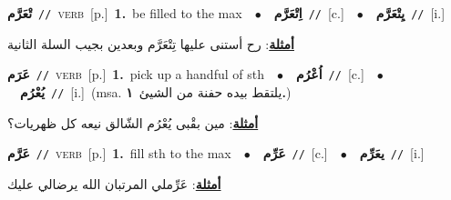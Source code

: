 \documentclass[10pt,a4paper,twoside]{article} %
\begin{document}
\begin{multicols}{2}
{\setlength\topsep{0pt}\textbf{\foreignlanguage{arabic}{تْعَرَّم}}\ {\color{gray}\texttt{//}\color{black}}\ \textsc{verb}\ [p.]\ \textbf{1.}~be filled to the max\ \ $\bullet$\ \ \setlength\topsep{0pt}\textbf{\foreignlanguage{arabic}{اِتْعَرَّم}}\ {\color{gray}\texttt{//}\color{black}}\ [c.]\ \ $\bullet$\ \ \setlength\topsep{0pt}\textbf{\foreignlanguage{arabic}{يِتْعَرَّم}}\ {\color{gray}\texttt{//}\color{black}}\ [i.]\  \begin{flushright}\color{gray}\foreignlanguage{arabic}{\textbf{\underline{\foreignlanguage{arabic}{أمثلة}}}: رح أستنى عليها تِتْعَرَّم وبعدين بجيب السلة الثانية}\end{flushright}\color{black}} \vspace{2mm}

{\setlength\topsep{0pt}\textbf{\foreignlanguage{arabic}{عَرَم}}\ {\color{gray}\texttt{//}\color{black}}\ \textsc{verb}\ [p.]\ \textbf{1.}~pick up a handful of sth\ \ $\bullet$\ \ \setlength\topsep{0pt}\textbf{\foreignlanguage{arabic}{اُعْرُم}}\ {\color{gray}\texttt{//}\color{black}}\ [c.]\ \ $\bullet$\ \ \setlength\topsep{0pt}\textbf{\foreignlanguage{arabic}{يُعْرُم}}\ {\color{gray}\texttt{//}\color{black}}\ [i.]\ \color{gray}(msa. \foreignlanguage{arabic}{يلتقط بيده حفنة من الشيئ}~\foreignlanguage{arabic}{\textbf{١.}})\color{black}\  \begin{flushright}\color{gray}\foreignlanguage{arabic}{\textbf{\underline{\foreignlanguage{arabic}{أمثلة}}}: مين بقْبى يُعْرُم الشّالق نيعه كل ظهريات؟}\end{flushright}\color{black}} \vspace{2mm}

{\setlength\topsep{0pt}\textbf{\foreignlanguage{arabic}{عَرَّم}}\ {\color{gray}\texttt{//}\color{black}}\ \textsc{verb}\ [p.]\ \textbf{1.}~fill sth to the max\ \ $\bullet$\ \ \setlength\topsep{0pt}\textbf{\foreignlanguage{arabic}{عَرِّم}}\ {\color{gray}\texttt{//}\color{black}}\ [c.]\ \ $\bullet$\ \ \setlength\topsep{0pt}\textbf{\foreignlanguage{arabic}{يعَرِّم}}\ {\color{gray}\texttt{//}\color{black}}\ [i.]\  \begin{flushright}\color{gray}\foreignlanguage{arabic}{\textbf{\underline{\foreignlanguage{arabic}{أمثلة}}}: عَرِّملي المرتبان الله يرضالي عليك}\end{flushright}\color{black}} \vspace{2mm}


\end{multicols}
\end{document}

